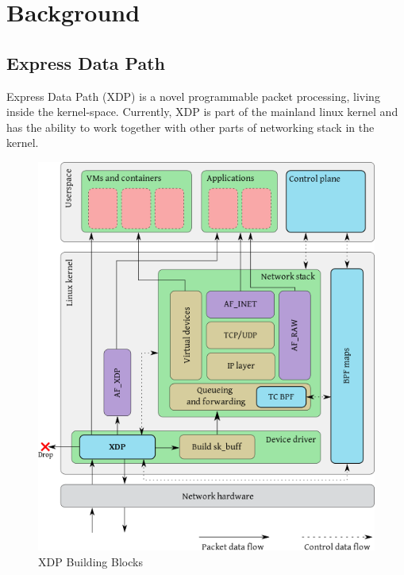 \documentclass[sigplan,screen]{acmart}
\begin{document}
\section{Background}
\subsection{Express Data Path}
Express Data Path (XDP) \cite{10.1145/3281411.3281443} is a novel programmable packet processing, living inside the kernel-space. Currently, XDP is part of the mainland linux kernel and has the ability to work together with other parts of networking stack in the kernel.

\begin{figure}[htbp]
\centerline{\includegraphics[scale=0.35]{pic/xdp-diagram-cut.png}}
\caption{XDP Building Blocks \cite{10.1145/3281411.3281443}}
\label{xdp}
\end{figure}
\end{document}
